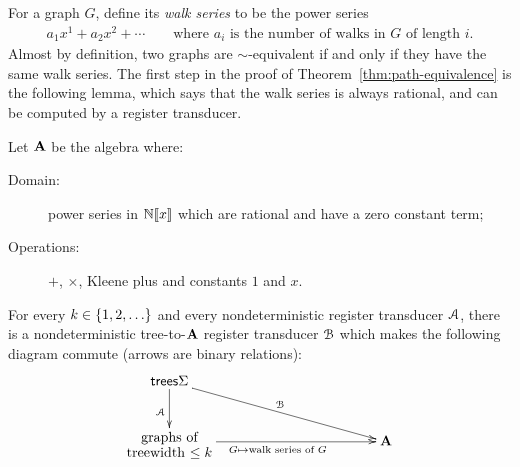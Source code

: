 For a graph $G$, define its \emph{walk series} to be the power series 
\begin{align*}
  a_1 x^1 + a_2x^2 + \cdots \qquad \text{where $a_i$ is the number of walks in $G$ of length $i$.}
\end{align*}
Almost by definition, two graphs are $\sim$-equivalent if and only if they have the same walk series. 
The first step in the proof of Theorem~\ref{thm:path-equivalence} is the following lemma, which says  that the walk series is always  rational, and can be computed by a register transducer.
\begin{lemma}\label{lem:compute-power-series}    
    Let $\mathbf{A}$ be the algebra where:
    \begin{description}
        \item[Domain:]power series in $\mathbb N [\![x]\!]$ which are rational and have a  zero constant term;
        \item[Operations:] $+$, $\times$, Kleene plus and constants $1$ and $x$.
    \end{description}
    For every $k \in \{1,2,\ldots\}$ and every nondeterministic   register transducer ${\mathcal A}$, there is a nondeterministic tree-to-$\mathbf{A}$ register transducer ${\mathcal B}$ which makes the following diagram commute (arrows are binary relations):
    \begin{align*}
    \xymatrix@C=4cm{
        \trees \Sigma   
        \ar[dr]^{\Bb}
        \ar[d]_{\Aa} \\
        \txt{graphs of\\
        treewidth $\le k$} \ar[r]_{G \mapsto \text{walk series of $G$}}& \aalg
    }
    \end{align*}
\end{lemma}
